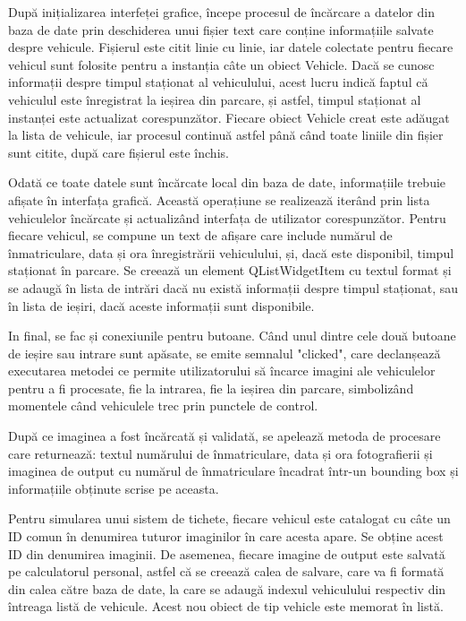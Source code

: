 \documentclass[a4paper,12pt]{report}
\begin{document}
După inițializarea interfeței grafice, începe procesul de încărcare a datelor din baza de date prin deschiderea unui fișier text care conține informațiile salvate despre vehicule. Fișierul este citit linie cu linie, iar datele colectate pentru fiecare vehicul sunt folosite pentru a instanția câte un obiect Vehicle. Dacă se cunosc informații despre timpul staționat al vehiculului, acest lucru indică faptul că vehiculul este înregistrat la ieșirea din parcare, și astfel, timpul staționat al instanței este actualizat corespunzător. Fiecare obiect Vehicle creat este adăugat la lista de vehicule, iar procesul continuă astfel până când toate liniile din fișier sunt citite, după care fișierul este închis.

Odată ce toate datele sunt încărcate local din baza de date, informațiile trebuie afișate în interfața grafică. Această operațiune se realizează iterând prin lista vehiculelor încărcate și actualizând interfața de utilizator corespunzător. Pentru fiecare vehicul, se compune un text de afișare care include numărul de înmatriculare, data și ora înregistrării vehiculului, și, dacă este disponibil, timpul staționat în parcare. Se creează un element QListWidgetItem cu textul format și se adaugă în lista de intrări dacă nu există informații despre timpul staționat, sau în lista de ieșiri, dacă aceste informații sunt disponibile.

In final, se fac și conexiunile pentru butoane. Când unul dintre cele două butoane de ieșire sau intrare sunt apăsate, se emite semnalul "clicked", care declanșează executarea metodei ce permite utilizatorului să încarce imagini ale vehiculelor pentru a fi procesate, fie la intrarea, fie la ieșirea din parcare, simbolizând momentele când vehiculele trec prin punctele de control.

După ce imaginea a fost încărcată și validată, se apelează metoda de procesare care returnează: textul numărului de înmatriculare, data și ora fotografierii și imaginea de output cu numărul de înmatriculare încadrat într-un bounding box și informațiile obținute scrise pe aceasta.

Pentru simularea unui sistem de tichete, fiecare vehicul este catalogat cu câte un ID comun în denumirea tuturor imaginilor în care acesta apare. Se obține acest ID din denumirea imaginii. De asemenea, fiecare imagine de output este salvată pe calculatorul personal, astfel că se creează calea de salvare, care va fi formată din calea către baza de date, la care se adaugă indexul vehiculului respectiv din întreaga listă de vehicule. Acest nou obiect de tip vehicle este memorat în listă.
\end{document}
